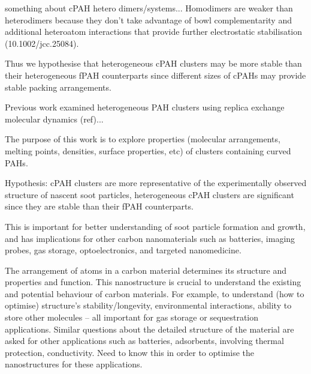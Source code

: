 something about cPAH hetero dimers/systems...
Homodimers are weaker than heterodimers because they don't take advantage of bowl complementarity and additional heteroatom interactions that provide further electrostatic stabilisation (10.1002/jcc.25084).

Thus we hypothesise that heterogeneous cPAH clusters may be more stable than their heterogeneous fPAH counterparts since different sizes of cPAHs may provide stable packing arrangements.





Previous work examined heterogeneous PAH clusters using replica exchange molecular dynamics (ref)...

The purpose of this work is to explore properties (molecular arrangements, melting points, densities, surface properties, etc) of clusters containing curved PAHs.  

Hypothesis: cPAH clusters are more representative of the experimentally observed structure of nascent soot particles, heterogeneous cPAH clusters are significant since they are stable than their fPAH counterparts.

This is important for better understanding of soot particle formation and growth, and has implications for other carbon nanomaterials such as batteries, imaging probes, gas storage, optoelectronics, and targeted nanomedicine.




The arrangement of atoms in a carbon material determines its structure and properties and function. This nanostructure is crucial to understand the existing and potential behaviour of carbon materials. For example, to understand (how to optimise) structure's stability/longevity, environmental interactions, ability to store other molecules -- all important for gas storage or sequestration applications.  Similar questions about the detailed structure of the material are asked for other applications such as batteries, adsorbents, involving thermal protection, conductivity.
Need to know this in order to optimise the nanostructures for these applications.

